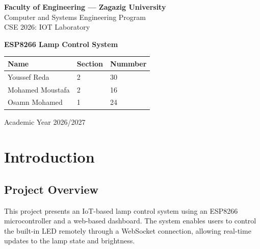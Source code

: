 \documentclass[12pt,a4paper]{article}
\begin{document}
\thispagestyle{empty}

\vspace{2cm}

\begin{center}
    {\large \textbf{Faculty of Engineering --- Zagazig University}}\\
    {\large Computer and Systems Engineering Program}\\[0.3cm]
    {\small CSE 2026: IOT Laboratory}

    \vspace{3cm}

    {\Huge \textbf{ESP8266 Lamp Control System}}
\end{center}

\vspace{4cm}

\begin{center}
    \renewcommand{\arraystretch}{1.5}
    \begin{tabular}{|p{5cm}|p{3cm}|p{3cm}|}
        \hline
        \textbf{Name}    & \textbf{Section} & \textbf{Nummber} \\
        \hline
        Youssef Reda     & 2                & 30               \\
        \hline
        Mohamed Moustafa & 2                & 16               \\
        \hline
        Osamn Mohamed    & 1                & 24               \\
        \hline
    \end{tabular}
\end{center}

\vfill

\begin{center}
    Academic Year 2026/2027
\end{center}

\newpage

\tableofcontents


\newpage
\section*{Introduction}

\vspace{0.3cm}

\subsection*{Project Overview}
This project presents an IoT-based lamp control system using an ESP8266
microcontroller and a web-based dashboard. The system enables users to
control the built-in LED remotely through a WebSocket connection, allowing
real-time updates to the lamp state and brightness.
\end{document}
